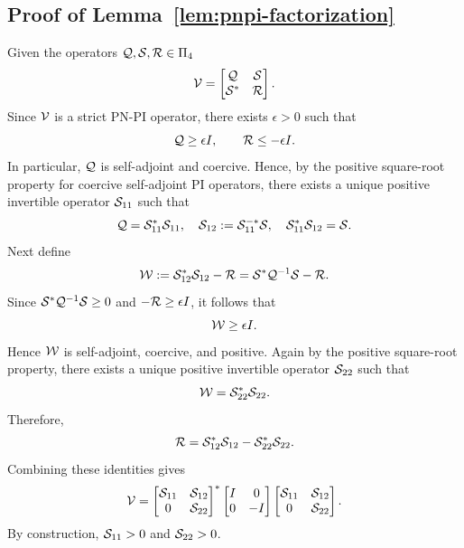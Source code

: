 
\subsection{Proof of Lemma~\ref{lem:pnpi-factorization}}\label{proof:pnpi-factorization}
Given the operators $\mathcal{Q}, \mathcal{S}, \mathcal{R} \in \Pi_4$
\begin{equation*}
\mathcal{V}=\begin{bmatrix}\mathcal{Q} & \mathcal{S} \\ \mathcal{S}^* & \mathcal{R}\end{bmatrix}.
\end{equation*}
Since $\mathcal{V}$ is a strict PN-PI operator, there exists $\epsilon>0$ such that
\begin{equation*}
\mathcal{Q} \ge \epsilon I, \qquad \mathcal{R}\le -\epsilon I.
\end{equation*}
In particular, $\mathcal{Q}$ is self-adjoint and coercive. Hence, by the positive
square-root property for coercive self-adjoint PI operators, there
exists a unique positive invertible operator $\mathcal{S}_{11}$ such that
\begin{equation*}
{\mathcal{Q}=\mathcal{S}_{11}^*\mathcal{S}_{11}}, \quad
\mathcal{S}_{12}:=\mathcal{S}_{11}^{-*}\mathcal{S}, \quad
\mathcal{S}_{11}^*\mathcal{S}_{12}=\mathcal{S}.
\end{equation*}
Next define
\begin{equation*}
\mathcal{W}:=\mathcal{S}_{12}^*\mathcal{S}_{12}-\mathcal{R}=\mathcal{S}^*\mathcal{Q}^{-1}\mathcal{S}-\mathcal{R}.
\end{equation*}
Since $\mathcal{S}^*\mathcal{Q}^{-1}\mathcal{S}\ge 0$ and $-\mathcal{R}\ge \epsilon I$, it follows
that
\begin{equation*}
\mathcal{W}\ge \epsilon I.
\end{equation*}
Hence $\mathcal{W}$ is self-adjoint, coercive, and positive. Again by the positive
square-root property, there exists a unique positive invertible operator
$\mathcal{S}_{22}$ such that
\begin{equation*}
\mathcal{W}=\mathcal{S}_{22}^*\mathcal{S}_{22}.
\end{equation*}
Therefore,
\begin{equation*}
\mathcal{R}=\mathcal{S}_{12}^*\mathcal{S}_{12}-\mathcal{S}_{22}^*\mathcal{S}_{22}.
\end{equation*}
Combining these identities gives
\begin{equation*}
\mathcal{V}=\begin{bmatrix}\mathcal{S}_{11} & \mathcal{S}_{12} \\ 0 & \mathcal{S}_{22}\end{bmatrix}^*\begin{bmatrix}I & 0 \\ 0 &
-I\end{bmatrix}\begin{bmatrix}\mathcal{S}_{11} & \mathcal{S}_{12} \\ 0 & \mathcal{S}_{22}\end{bmatrix}.
\end{equation*}
By construction, $\mathcal{S}_{11}>0$ and $\mathcal{S}_{22}>0$.

